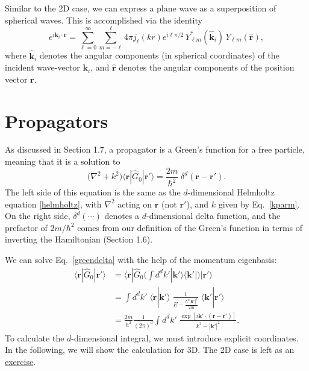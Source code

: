 \documentclass[pra,12pt]{revtex4}
\begin{document}
Similar to the 2D case, we can express a plane wave as a superposition
of spherical waves.  This is accomplished via the identity
\begin{equation}
  e^{i\mathbf{k}_i \cdot \mathbf{r}}
  = \sum_{\ell=0}^\infty \sum_{m=-\ell}^\ell 4 \pi j_{\ell}(kr) e^{i\ell\pi/2} \,
  Y_{\ell m}^*(\hat{\mathbf{k}}_i) \, Y_{\ell m}(\hat{\mathbf{r}}),
  \label{plane_wave_decomp}
\end{equation}
where $\hat{\mathbf{k}}_i$ denotes the angular components (in
spherical coordinates) of the incident wave-vector $\mathbf{k}_i$, and
$\hat{\mathbf{r}}$ denotes the angular components of the position
vector $\mathbf{r}$.

\section{Propagators}
\label{sec:propagator}

As discussed in Section 1.7, a propagator is a Green's function for a
free particle, meaning that it is a solution to
\begin{equation}
  \Big(\nabla^2 + k^2\Big) \langle\mathbf{r} |\hat{G}_0 |\mathbf{r}'\rangle
  = \frac{2m}{\hbar^2} \; \delta^d(\mathbf{r}-\mathbf{r}').
  \label{greendelta}
\end{equation}
The left side of this equation is the same as the $d$-dimensional
Helmholtz equation \eqref{helmholtz}, with $\nabla^2$ acting on
$\mathbf{r}$ (not $\mathbf{r}'$), and $k$ given by Eq.~\eqref{kparm}.
On the right side, $\delta^d(\cdots)$ denotes a $d$-dimensional delta
function, and the prefactor of $2m/\hbar^2$ comes from our definition
of the Green's function in terms of inverting the Hamiltonian (Section
1.6).

We can solve Eq.~\eqref{greendelta} with the help of the momentum
eigenbasis:
\begin{align}
  \langle\mathbf{r}|\hat{G}_0|\mathbf{r}'\rangle
  &= \langle\mathbf{r}|\hat{G}_0 \Big(\int d^dk' |\mathbf{k}'\rangle\langle\mathbf{k}'| \Big) |\mathbf{r}'\rangle \nonumber \\
  &= \int d^dk' \; \langle\mathbf{r}|\mathbf{k}'\rangle \;
  \frac{1}{E-\frac{\hbar^2|\mathbf{k}'|^2}{2m}} \;
  \langle\mathbf{k}'|\mathbf{r}'\rangle \nonumber \\
  &= \frac{2m}{\hbar^2} \frac{1}{(2\pi)^d} \int d^dk' \;
  \frac{\exp\left[i\mathbf{k}' \cdot
      (\mathbf{r}-\mathbf{r}')\right]}{k^2-|\mathbf{k}'|^2}.
  \label{rGr}
\end{align}
To calculate the $d$-dimensional integral, we must introduce explicit
coordinates.  In the following, we will show the calculation for 3D.
The 2D case is left as an \hyperref[ex:2dpropagator]{exercise}.
\end{document}
